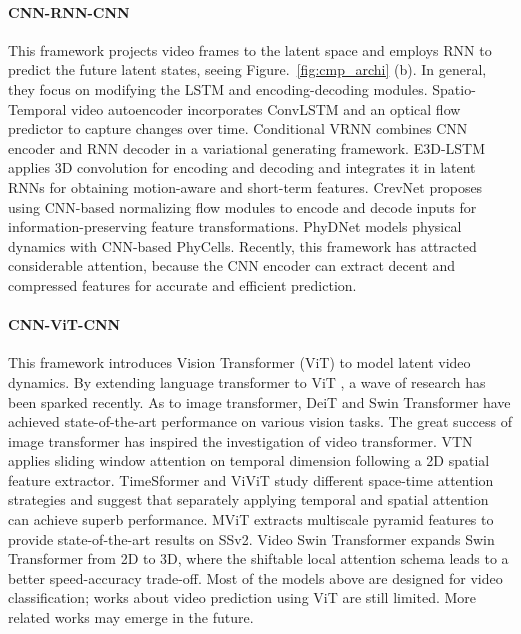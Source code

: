 \documentclass[10pt,twocolumn,letterpaper]{article}
\begin{document}
\paragraph{CNN-RNN-CNN} This framework projects video frames to the latent space and employs RNN to predict the future latent states, seeing Figure.~\ref{fig:cmp_archi} (b). In general, they focus on modifying the LSTM and encoding-decoding modules. Spatio-Temporal video autoencoder \cite{patraucean2015spatio} incorporates ConvLSTM and an optical flow predictor to capture changes over time. Conditional VRNN \cite{castrejon2019improved} combines CNN encoder and RNN decoder in a variational generating framework. E3D-LSTM \cite{wang2018eidetic} applies 3D convolution for encoding and decoding and integrates it in latent RNNs for obtaining motion-aware and short-term features. CrevNet \cite{yu2019efficient} proposes using CNN-based normalizing flow modules to encode and decode inputs for information-preserving feature transformations. PhyDNet \cite{guen2020disentangling} models physical dynamics with CNN-based PhyCells. Recently, this framework has attracted considerable attention, because the CNN encoder can extract decent and compressed features for accurate and efficient prediction.


\paragraph{CNN-ViT-CNN} This framework introduces Vision Transformer (ViT) to model latent video dynamics. By extending language transformer \cite{vaswani2017attention} to ViT \cite{dosovitskiy2020image}, a wave of research has been sparked recently. As to image transformer, DeiT \cite{touvron2021training} and Swin Transformer \cite{liu2021swin} have achieved state-of-the-art performance on various vision tasks. The great success of image transformer has inspired the investigation of video transformer. VTN \cite{neimark2021video} applies sliding window attention on temporal dimension following a 2D spatial feature extractor. TimeSformer and ViViT \cite{bertasius2021space, arnab2021vivit} study different space-time attention strategies and suggest that separately applying temporal and spatial attention can achieve superb performance. MViT \cite{fan2021multiscale} extracts multiscale pyramid features to provide state-of-the-art results on SSv2. Video Swin Transformer \cite{liu2021video} expands Swin Transformer from 2D to 3D, where the shiftable local attention schema leads to a better speed-accuracy trade-off. Most of the models above are designed for video classification; works about video prediction \cite{weissenborn2019scaling,rakhimov2020latent} using ViT are still limited. More related works may emerge in the future.
\end{document}
